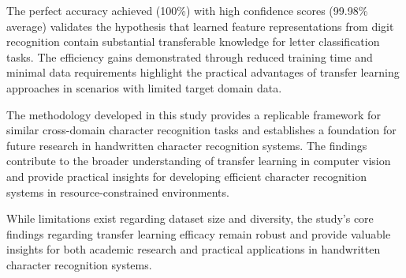 \documentclass[12pt,a4paper]{article}
\begin{document}
The perfect accuracy achieved (100\%) with high confidence scores (99.98\% average) validates the hypothesis that learned feature representations from digit recognition contain substantial transferable knowledge for letter classification tasks. The efficiency gains demonstrated through reduced training time and minimal data requirements highlight the practical advantages of transfer learning approaches in scenarios with limited target domain data.

The methodology developed in this study provides a replicable framework for similar cross-domain character recognition tasks and establishes a foundation for future research in handwritten character recognition systems. The findings contribute to the broader understanding of transfer learning in computer vision and provide practical insights for developing efficient character recognition systems in resource-constrained environments.

While limitations exist regarding dataset size and diversity, the study's core findings regarding transfer learning efficacy remain robust and provide valuable insights for both academic research and practical applications in handwritten character recognition systems.
\end{document}
